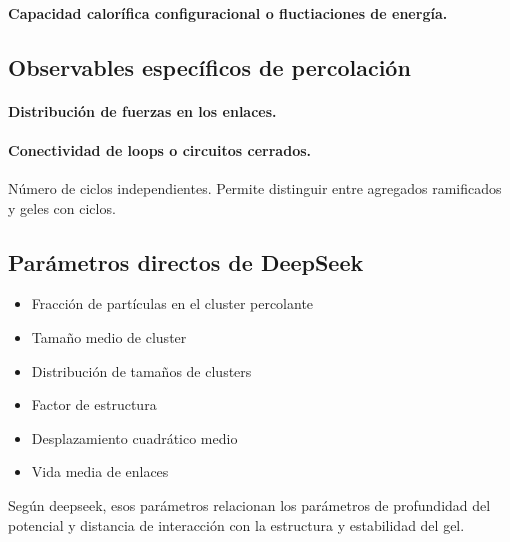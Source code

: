 \documentclass[../main.tex]{subfiles}
\begin{document}
\paragraph{Capacidad calorífica configuracional o fluctiaciones de energía.}

\subsection{Observables específicos de percolación}

\paragraph{Distribución de fuerzas en los enlaces.}

\paragraph{Conectividad de loops o circuitos cerrados.}
Número de ciclos independientes.
Permite distinguir entre agregados ramificados y geles con ciclos.

\subsection{Parámetros directos de DeepSeek}

\begin{itemize}
    \item Fracción de partículas en el cluster percolante
    \item Tamaño medio de cluster 
    \item Distribución de tamaños de clusters 
    \item Factor de estructura
    \item Desplazamiento cuadrático medio
    \item Vida media de enlaces
\end{itemize}

Según deepseek, esos parámetros relacionan los parámetros de profundidad del potencial y distancia de interacción con la estructura y estabilidad del gel.
\end{document}
